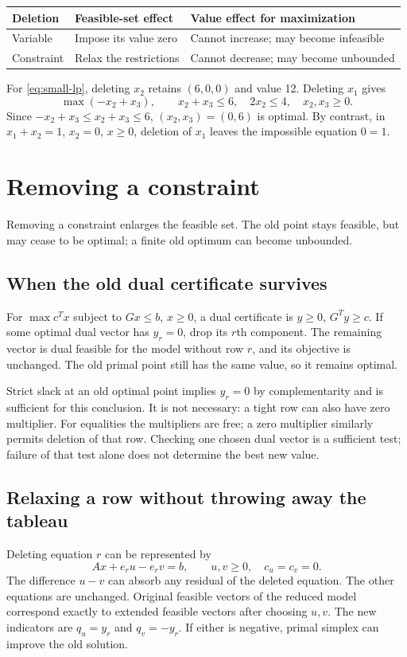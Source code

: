 \documentclass[11pt,a4paper]{article}
\begin{document}
\begin{center}
  \begin{tabular}{>{\raggedright\arraybackslash}p{4cm}>{\raggedright\arraybackslash}p{4.3cm}>{\raggedright\arraybackslash}p{4.8cm}}
    \toprule
    Deletion & Feasible-set effect & Value effect for maximization\\\midrule
    Variable & Impose its value zero & Cannot increase; may become infeasible\\
    Constraint & Relax the restrictions & Cannot decrease; may become unbounded\\\bottomrule
  \end{tabular}
\end{center}
For \eqref{eq:small-lp}, deleting $x_2$ retains $(6,0,0)$ and value 12.
Deleting $x_1$ gives
\[
  \max(-x_2+x_3),\qquad x_2+x_3\leq6,\quad 2x_2\leq4,\quad x_2,x_3\geq0.
\]
Since $-x_2+x_3\leq x_2+x_3\leq6$, $(x_2,x_3)=(0,6)$ is optimal.
By contrast, in $x_1+x_2=1$, $x_2=0$, $x\geq0$, deletion of $x_1$
leaves the impossible equation $0=1$.

\section{Removing a constraint}\label{sec:delete-constraint}
Removing a constraint enlarges the feasible set. The old point stays feasible,
but may cease to be optimal; a finite old optimum can become unbounded.

\subsection{When the old dual certificate survives}
For $\max c^Tx$ subject to $Gx\leq b$, $x\geq0$, a dual certificate is
$y\geq0$, $G^Ty\geq c$. If some optimal dual vector has $y_r=0$, drop its
$r$th component. The remaining vector is dual feasible for the model without
row $r$, and its objective is unchanged. The old primal point still has the
same value, so it remains optimal.

Strict slack at an old optimal point implies $y_r=0$ by complementarity
and is sufficient for this conclusion. It is not necessary: a tight row can
also have zero multiplier. For equalities the multipliers are free; a zero
multiplier similarly permits deletion of that row.
Checking one chosen dual vector is a sufficient test; failure of that test
alone does not determine the best new value.

\subsection{Relaxing a row without throwing away the tableau}
Deleting equation $r$ can be represented by
\[
  Ax+e_r u-e_r v=b,\qquad u,v\geq0,\quad c_u=c_v=0.
\]
The difference $u-v$ can absorb any residual of the deleted equation.
The other equations are unchanged. Original feasible vectors of the reduced
model correspond exactly to extended feasible vectors after choosing $u,v$.
The new indicators are $q_u=y_r$ and $q_v=-y_r$.
If either is negative, primal simplex can improve the old solution.
\end{document}
